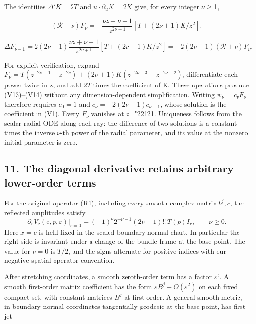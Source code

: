 \documentclass[
  11pt,
]{article}
\begin{document}
The identities \(\Delta'K=2T\) and \(u\cdot\partial_uK=2K\) give, for
every integer \ensuremath{\nu}\ensuremath{\geq}1,

\[
 (\mathcal R+\nu)F_\nu
 =-\frac{\nu z+\nu+1}{z^{2\nu+1}}
             \left[T+(2\nu+1)K/z^2\right],
 \tag{V13}
\]

\[
 \Delta F_{\nu-1}
 =2(2\nu-1)\frac{\nu z+\nu+1}{z^{2\nu+1}}
             \left[T+(2\nu+1)K/z^2\right]
 =-2(2\nu-1)(\mathcal R+\nu)F_\nu.
 \tag{V14}
\]

For explicit verification, expand \(F_\nu=T(z^{-2\nu-1}+z^{-2\nu})
+(2\nu+1)K(z^{-2\nu-3}+z^{-2\nu-2})\), differentiate each power twice in
z, and add \(2T\) times the coefficient of K. These operations produce
(V13)--(V14) without any dimension-dependent simplification. Writing
\(w_\nu=c_\nu F_\nu\) therefore requires \(c_0=1\) and
\(c_\nu=-2(2\nu-1)c_{\nu-1}\), whose solution is the coefficient in
(V1). Every \(F_\nu\) vanishes at z={\ReaderSymbols\char"2212}1. Uniqueness follows from the
scalar radial ODE along each ray: the difference of two solutions is a
constant times the inverse \ensuremath{\nu}-th power of the radial parameter, and its
value at the nonzero initial parameter is zero.

\subsection{11. The diagonal derivative retains arbitrary lower-order
terms}\label{the-diagonal-derivative-retains-arbitrary-lower-order-terms}

For the original operator (R1), including every smooth complex matrix
\(b^j,c\), the reflected amplitudes satisfy \[
 \left.\partial_\varepsilon V_\nu(e,p,\varepsilon)
                    \right|_{\varepsilon=0}
   =(-1)^\nu 2^{-\nu-1}(2\nu-1)!!\,T(p)I_r,
       \qquad \nu\geq0.                                   \tag{V2}
\] Here \(x=e\) is held fixed in the scaled boundary-normal chart. In
particular the right side is invariant under a change of the bundle
frame at the base point. The value for \(\nu=0\) is \(T/2\), and the
signs alternate for positive indices with our negative spatial operator
convention.

After stretching coordinates, a smooth zeroth-order term has a factor
\ensuremath{\varepsilon}². A smooth first-order matrix coefficient has the form
\(\varepsilon B^j+O(\varepsilon^2)\) on each fixed compact set, with
constant matrices \ensuremath{B^j} at first order. A general smooth metric, in
boundary-normal coordinates tangentially geodesic at the base point, has
first jet
\end{document}

